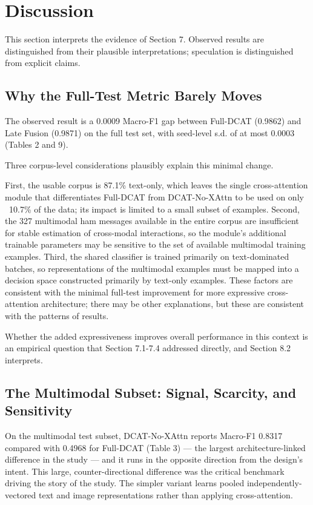 \documentclass[10pt,twoside]{article}
\begin{document}
\section{Discussion}\label{sec:8}

This section interprets the evidence of Section 7. Observed results are distinguished from their plausible interpretations; speculation is distinguished from explicit claims.

\subsection{Why the Full-Test Metric Barely Moves}\label{sec:8.1}

The observed result is a 0.0009 Macro-F1 gap between Full-DCAT (0.9862) and Late Fusion (0.9871) on the full test set, with seed-level s.d. of at most 0.0003 (Tables 2 and 9).

Three corpus-level considerations plausibly explain this minimal change.

First, the usable corpus is 87.1\% text-only, which leaves the single cross-attention module that differentiates Full-DCAT from DCAT-No-XAttn to be used on only ~10.7\% of the data; its impact is limited to a small subset of examples. Second, the 327 multimodal ham messages available in the entire corpus are insufficient for stable estimation of cross-modal interactions, so the module's additional trainable parameters may be sensitive to the set of available multimodal training examples. Third, the shared classifier is trained primarily on text-dominated batches, so representations of the multimodal examples must be mapped into a decision space constructed primarily by text-only examples. These factors are consistent with the minimal full-test improvement for more expressive cross-attention architecture; there may be other explanations, but these are consistent with the patterns of results.

Whether the added expressiveness improves overall performance in this context is an empirical question that Section 7.1-7.4 addressed directly, and Section 8.2 interprets.

\subsection{The Multimodal Subset: Signal, Scarcity, and Sensitivity}\label{sec:8.2}

On the multimodal test subset, DCAT-No-XAttn reports Macro-F1 0.8317 compared with 0.4968 for Full-DCAT (Table 3) --- the largest architecture-linked difference in the study --- and it runs in the opposite direction from the design's intent. This large, counter-directional difference was the critical benchmark driving the story of the study. The simpler variant learns pooled independently-vectored text and image representations rather than applying cross-attention.
\end{document}
